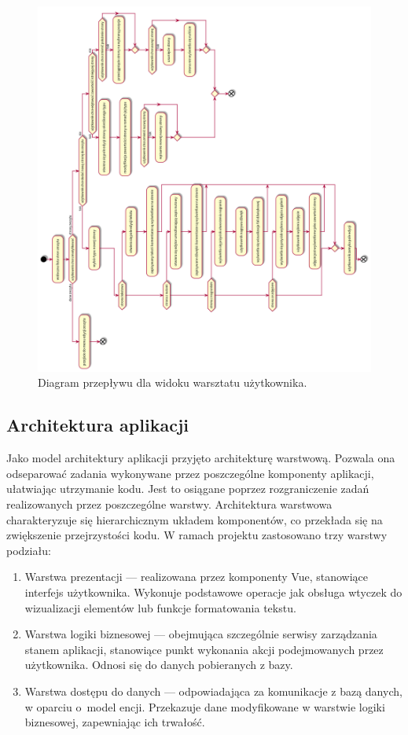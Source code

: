 \begin{figure}[H]
	\begin{center}
		\includegraphics[scale=0.39]{media/UserFlowWorkshop180.png}
	\end{center}
	\caption{Diagram przepływu dla widoku warsztatu użytkownika.}
	\label{rys:flow-workshop}
\end{figure}

\subsection{Architektura aplikacji}
Jako model architektury aplikacji przyjęto architekturę warstwową. Pozwala ona odseparować zadania wykonywane przez
poszczególne komponenty aplikacji, ułatwiając utrzymanie kodu. Jest to osiągane poprzez rozgraniczenie zadań
realizowanych przez poszczególne warstwy. Architektura warstwowa charakteryzuje się hierarchicznym układem komponentów,
co przekłada się na zwiększenie przejrzystości kodu. W ramach projektu zastosowano trzy warstwy podziału:

\begin{enumerate}
	\item Warstwa prezentacji — realizowana przez komponenty Vue, stanowiące interfejs użytkownika. Wykonuje podstawowe operacje
	      jak obsługa wtyczek do wizualizacji elementów lub funkcje formatowania tekstu.
	\item Warstwa logiki biznesowej — obejmująca szczególnie serwisy zarządzania stanem aplikacji, stanowiące punkt wykonania
	      akcji podejmowanych przez użytkownika. Odnosi się do danych pobieranych z bazy.
	\item Warstwa dostępu do danych — odpowiadająca za komunikacje z bazą danych, w oparciu o~model encji. Przekazuje
	      dane modyfikowane w warstwie logiki biznesowej, zapewniając ich trwałość.
\end{enumerate}

